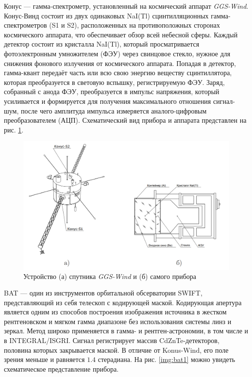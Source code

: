 	
	Конус --- гамма-спектрометр, установленный на космический аппарат \textit{GGS-Wind}. Конус-Винд состоит из двух одинаковых NaI(Tl) сцинтилляционных гамма-спектрометров (S1 и S2), расположенных на противоположных сторонах космического аппарата, что обеспечивает обзор всей небесной сферы. Каждый детектор состоит из кристалла NaI(Tl), который  просматривается фотоэлектронным умножителем (ФЭУ) через свинцовое стекло, нужное для снижения фонового излучения от космического аппарата. Попадая в детектор, гамма-квант передаёт часть или всю свою энергию
веществу сцинтиллятора, которая преобразуется в световую вспышку, регистрируемую ФЭУ. Заряд, собранный с анода ФЭУ, преобразуется в импульс напряжения, который усиливается и формируется для получения максимального отношения сигнал-шум, после чего амплитуда импульса измеряется аналого-цифровым преобразователем (АЦП). Схематический вид прибора и аппарата представлен на рис. \ref{img:kw1}.  \cite{Svinkin_thesis}
	
	\begin{figure}[h!]
		\centering
		\includegraphics[width = 0.75\linewidth]{pictures/Konus-Wind.png}
		\caption{Устройство (а) спутника \textit{GGS-Wind} и (б) самого прибора}
		\label{img:kw1}
	\end{figure}
	
	BAT --- один из инструментов орбитальной обсерватории SWIFT, представляющий из себя телескоп с кодирующей маской. Кодирующая апертура является одним из способов построения изображения источника в жестком рентгеновском и мягком гамма диапазоне 
	без использования системы линз и зеркал. Метод широко применяется в гамма- и рентген-астрономии, в том числе и в INTEGRAL/ISGRI. Сигнал регистрирует массив
	 CdZnTe-детекторов, половина которых закрывается маской. В отличие от Konus-Wind, его поле зрения меньше и равняется $1.4$ стерадиана. На рис. \ref{img:bat1} можно увидеть схематическое представление прибора.
	 
